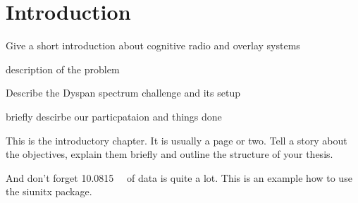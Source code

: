 \chapter{Introduction}

Give a short introduction about cognitive radio and overlay systems

description of the problem

Describe the Dyspan spectrum challenge and its setup

briefly descirbe our particpataion and things done






This is the introductory chapter.
It is usually a page or two.
Tell a story about the objectives, explain them briefly and outline the structure of your thesis.

And don't forget \SI{10.0815}{\giga\byte} of data is quite a lot.
This is an example how to use the siunitx package.


